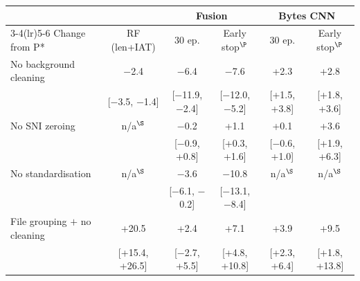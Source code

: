\begin{tabular}{lccccc}
\toprule
 & & \multicolumn{2}{c}{Fusion} & \multicolumn{2}{c}{Bytes CNN} \\
\cmidrule(lr){3-4}\cmidrule(lr){5-6}
Change from P* & RF (len+IAT) & 30 ep. & Early stop$^\P$ & 30 ep. & Early stop$^\P$ \\
\midrule
No background cleaning & $-$2.4 & $-$6.4 & $-$7.6 & +2.3 & +2.8 \\
 & [$-$3.5, $-$1.4] & [$-$11.9, $-$2.4] & [$-$12.0, $-$5.2] & [+1.5, +3.8] & [+1.8, +3.6] \\[1pt]
No SNI zeroing & n/a$^\S$ & $-$0.2 & +1.1 & +0.1 & +3.6 \\
 &  & [$-$0.9, +0.8] & [+0.3, +1.6] & [$-$0.6, +1.0] & [+1.9, +6.3] \\[1pt]
No standardisation & n/a$^\S$ & $-$3.6 & $-$10.8 & n/a$^\S$ & n/a$^\S$ \\
 &  & [$-$6.1, $-$0.2] & [$-$13.1, $-$8.4] &  &  \\[1pt]
File grouping $+$ no cleaning & +20.5 & +2.4 & +7.1 & +3.9 & +9.5 \\
 & [+15.4, +26.5] & [$-$2.7, +5.5] & [+4.8, +10.8] & [+2.3, +6.4] & [+1.8, +13.8] \\[1pt]
\bottomrule
\end{tabular}
